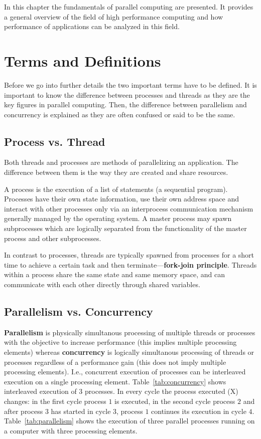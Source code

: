 In this chapter the fundamentals of parallel computing are
presented. It provides a general overview of the field of high
performance computing and how performance of applications can be
analyzed in this field.

\section{Terms and Definitions}
\label{sec:termsdef}

Before we go into further details the two important terms have to be
defined. It is important to know the difference between processes
and threads as they are the key figures in parallel computing.
Then, the difference between parallelism and concurrency is explained
as they are often confused or said to be the same.

\subsection{Process vs. Thread}

Both threads and processes are methods of parallelizing an
application. The difference between them is the way they are
created and share resources.

A process is the execution of a list of statements (a sequential
program). Processes have their own state information, use their own 
address space and interact with other processes only via an
interprocess communication mechanism generally managed by the operating
system. A master process may spawn subprocesses which are logically
separated from the functionality of the master process and other
subprocesses.

In contrast to processes, threads are typically spawned from processes
for a short time to achieve a certain task and then
terminate---\textbf{fork-join principle}. Threads within a process
share the same state and same memory space, and can communicate with
each other directly through shared variables.

\subsection{Parallelism vs. Concurrency}

\textbf{Parallelism} is physically simultanous processing of multiple
threads or processes with the objective
to increase performance (this implies multiple processing elements)
whereas \textbf{concurrency} is logically simultanous processing of
threads or processes regardless of a performance gain (this does not
imply multiple processing elements). I.e., concurrent execution of
processes can be interleaved execution on a single processing
element. Table~\ref{tab:concurrency} shows interleaved execution of 3
processes. In every cycle the process executed (X) changes: in the
first cycle process $1$ is executed, in the second cycle process $2$
and after process $3$ has started in cycle $3$, process $1$ continues
its execution in cycle $4$. Table~\ref{tab:parallelism} shows the
execution of three parallel processes running on a computer with three
processing elements. 

